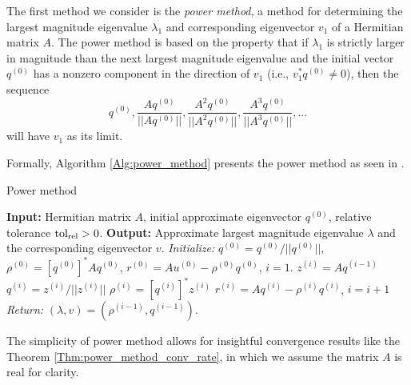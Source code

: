 The first method we consider is the \textit{power method}, a method for determining the largest magnitude eigenvalue $\lambda_1$ and corresponding eigenvector $v_1$ of a Hermitian matrix $A$.  The power method is based on the property that if $\lambda_1$ is strictly larger in magnitude than the next largest magnitude eigenvalue and the initial vector $q^{(0)}$ has a nonzero component in the direction of $v_1$ (i.e., $v_1^*q^{(0)} \neq 0$), then the sequence
\[
q^{(0)}, \frac{Aq^{(0)}}{||Aq^{(0)}||},  \frac{A^2q^{(0)}}{||A^2q^{(0)}||},  \frac{A^3q^{(0)}}{||A^3q^{(0)}||}, \ldots
\]
will have $v_1$ as its limit.  

Formally, Algorithm \ref{Alg:power_method} presents the power method as seen in \cite[Section 8.2.1]{golub2012matrix}.

\begin{algorithm}[H]
\caption{Power method}	\label{Alg:power_method}

\begin{algorithmic}[1]
	\Statex 	\textbf{Input:} Hermitian matrix $A$, initial approximate eigenvector $q^{(0)}$, relative tolerance $\textnormal{tol}_\textnormal{rel} > 0$.
	\Statex 	\textbf{Output:} Approximate largest magnitude eigenvalue $\lambda$ and the corresponding eigenvector $v$.
	\State		\textit{Initialize:} $q^{(0)} = q^{(0)}/||q^{(0)}||$, $\rho^{(0)} = [q^{(0)}]^*Aq^{(0)}$, $r^{(0)} = Au^{(0)} - \rho^{(0)}q^{(0)}$, $i= 1$.
		\State		$z^{(i)} = Aq^{(i-1)}$
		\State		$q^{(i)} = z^{(i)} / ||z^{(i)}||$
		\State		$\rho^{(i)} = [q^{(i)}]^* z^{(i)}$
		\State		$r^{(i)} = Aq^{(i)} - \rho^{(i)}q^{(i)}$, $i = i + 1$
	\EndWhile
	\State		\textit{Return:} $(\lambda, v) = (\rho^{(i-1)} , q^{(i-1)})$.
\end{algorithmic}

\end{algorithm}


The simplicity of power method allows for insightful convergence results like the Theorem \ref{Thm:power_method_conv_rate}, in which we assume the matrix $A$ is real for clarity.

